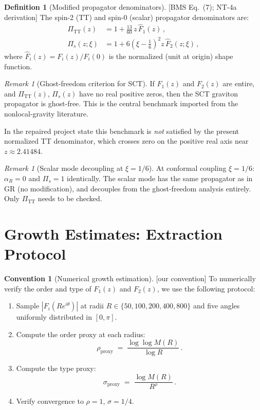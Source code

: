 \documentclass[12pt,a4paper]{article}
\theoremstyle{definition}
\newtheorem{definition}[proposition]{Definition}
\newtheorem{convention}[proposition]{Convention}
\theoremstyle{remark}
\newtheorem{remark}[proposition]{Remark}
\newcommand{\fromlit}[1]{\textcolor{blue!70!black}{\textsf{[#1]}}}
\newcommand{\oursign}{\textcolor{teal!80!black}{\textsf{[our convention]}}}
\begin{document}
\begin{definition}[Modified propagator denominators]
\label{def:denominators}
\fromlit{BMS Eq.~(7); NT-4a derivation}
The spin-2 (TT) and spin-0 (scalar) propagator denominators are:
\begin{align}
  \Pi_{\text{TT}}(z) &= 1 + \frac{13}{60}\, z\, \hat{F}_1(z)\,,
    \label{eq:Pi-TT}\\
  \Pi_s(z;\xi) &= 1 + 6\left(\xi-\frac{1}{6}\right)^2
    z\, \hat{F}_2(z;\xi)\,,
    \label{eq:Pi-s}
\end{align}
where $\hat{F}_i(z) = F_i(z)/F_i(0)$ is the normalized (unit at
origin) shape function.
\end{definition}

\begin{remark}[Ghost-freedom criterion for SCT]
If $F_1(z)$ and $F_2(z)$ are entire, and $\Pi_{\text{TT}}(z)$,
$\Pi_s(z)$ have no real positive zeros, then the SCT graviton
propagator is ghost-free.  This is the central benchmark imported from
the nonlocal-gravity literature.
\par\smallskip
In the repaired project state this benchmark is \emph{not} satisfied by
the present normalized TT denominator, which crosses zero on the
positive real axis near $z \approx 2.41484$.
\end{remark}

\begin{remark}[Scalar mode decoupling at $\xi = 1/6$]
At conformal coupling $\xi = 1/6$: $\alpha_R = 0$ and
$\Pi_s = 1$ identically.  The scalar mode has the same propagator
as in GR (no modification), and decouples from the ghost-freedom
analysis entirely.  Only $\Pi_{\text{TT}}$ needs to be checked.
\end{remark}


\section{Growth Estimates: Extraction Protocol}
\label{sec:growth}

\begin{convention}[Numerical growth estimation]
\label{conv:growth}
\oursign\;
To numerically verify the order and type of $F_1(z)$ and $F_2(z)$,
we use the following protocol:
\begin{enumerate}[nosep]
  \item Sample $|F_i(Re^{i\theta})|$ at radii
    $R \in \{50,100,200,400,800\}$ and five angles
    uniformly distributed in $[0,\pi]$.
  \item Compute the order proxy at each radius:
    \[
      \rho_{\mathrm{proxy}} \;=\; \frac{\log\log M(R)}{\log R}\,.
    \]
  \item Compute the type proxy:
    \[
      \sigma_{\mathrm{proxy}} \;=\; \frac{\log M(R)}{R^{\rho}}\,.
    \]
  \item Verify convergence to $\rho = 1$, $\sigma = 1/4$.
\end{enumerate}
\end{convention}
\end{document}
